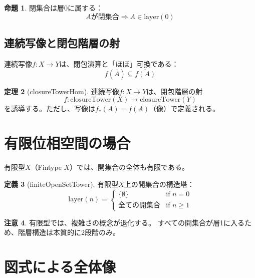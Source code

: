 \documentclass[a4paper,12pt]{ltjsarticle}
\theoremstyle{definition}
\newtheorem{definition}{定義}[section]
\newtheorem{theorem}[definition]{定理}
\newtheorem{proposition}[definition]{命題}
\newtheorem{remark}[definition]{注意}
\begin{document}
\begin{proposition}
閉集合は層0に属する：
\[
\text{$A$が閉集合} \Rightarrow A \in \mathrm{layer}(0)
\]
\end{proposition}

\subsection{連続写像と閉包階層の射}

連続写像$f: X \to Y$は、閉包演算と「ほぼ」可換である：
\[
f(\overline{A}) \subseteq \overline{f(A)}
\]

\begin{theorem}[closureTowerHom]
連続写像$f: X \to Y$は、閉包階層の射
\[
f: \mathrm{closureTower}(X) \longrightarrow \mathrm{closureTower}(Y)
\]
を誘導する。ただし、写像は$f_*(A) = f(A)$（像）で定義される。
\end{theorem}

\section{有限位相空間の場合}

有限型$X$（Fintype $X$）では、開集合の全体も有限である。

\begin{definition}[finiteOpenSetTower]
有限型$X$上の開集合の構造塔：
\[
\mathrm{layer}(n) =
\begin{cases}
  \{\emptyset\} & \text{if } n = 0 \\
  \text{全ての開集合} & \text{if } n \geq 1
\end{cases}
\]
\end{definition}

\begin{remark}
有限型では、複雑さの概念が退化する。
すべての開集合が層1に入るため、階層構造は本質的に2段階のみ。
\end{remark}

\section{図式による全体像}
\end{document}
